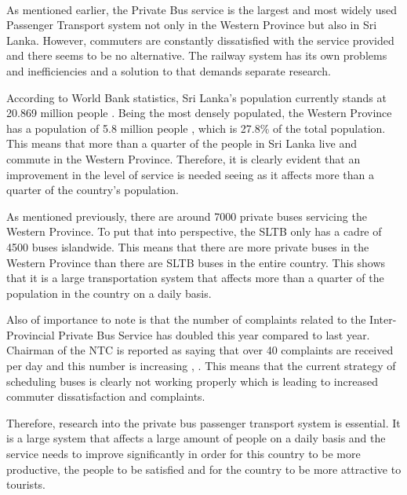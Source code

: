 \paragraph{} As mentioned earlier, the Private Bus service is the largest and most widely used Passenger Transport system not only in the Western Province but also in Sri Lanka. However, commuters are constantly dissatisfied with the service provided and there seems to be no alternative. The railway system has its own problems and inefficiencies and a solution to that demands separate research.

According to World Bank statistics, Sri Lanka’s population currently stands at 20.869 million people \cite{WorldBank2013}. Being the most densely populated, the Western Province has a population of 5.8 million people \cite{DepartmentofCensusandStatistics2012}, which is 27.8\% of the total population. This means that more than a quarter of the people in Sri Lanka live and commute in the Western Province. Therefore, it is clearly evident that an improvement in the level of service is needed seeing as it affects more than a quarter of the country’s population.

As mentioned previously, there are around 7000 private buses servicing the Western Province. To put that into perspective, the SLTB only has a cadre of 4500 buses islandwide. This means that there are more private buses in the Western Province than there are SLTB buses in the entire country. This shows that it is a large transportation system that affects more than a quarter of the population in the country on a daily basis.

Also of importance to note is that the number of complaints related to the Inter-Provincial Private Bus Service has doubled this year compared to last year. Chairman of the NTC is reported as saying that over 40 complaints are received per day and this number is increasing \cite{Wickremasekara2012}, \cite{Range2012}. This means that the current strategy of scheduling buses is clearly not working properly which is leading to increased commuter dissatisfaction and complaints.

Therefore, research into the private bus passenger transport system is essential. It is a large system that affects a large amount of people on a daily basis and the service needs to improve significantly in order for this country to be more productive, the people to be satisfied and for the country to be more attractive to tourists.

